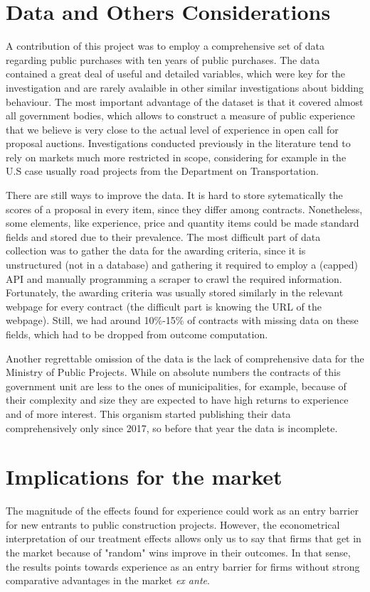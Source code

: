 \section{Data and Others Considerations}
A contribution of this project was to employ a comprehensive set of data regarding public purchases with ten years of public purchases. The data contained a great deal of useful and detailed variables, which were key for the investigation and are rarely avalaible in other similar investigations about bidding behaviour. The most important advantage of the dataset is that it covered almost all government bodies, which allows to construct a measure of public experience that we believe is very close to the actual level of experience in open call for proposal auctions. Investigations conducted previously in the literature tend to rely on markets much more restricted in scope, considering for example in the U.S case usually road projects from the Department on Transportation.

There are still ways to improve the data. It is hard to store sytematically the scores of a proposal in every item, since they differ among contracts. Nonetheless, some elements, like experience, price and quantity items could be made standard fields and stored due to their prevalence. The most difficult part of data collection was to gather the data for the awarding criteria, since it is unstructured (not in a database) and gathering it required to employ a (capped) API and manually programming a scraper to crawl the required information. Fortunately, the awarding criteria was usually stored similarly in the relevant webpage for every contract (the difficult part is knowing the URL of the webpage). Still, we had around 10\%-15\% of contracts with missing data on these fields, which had to be dropped from outcome computation.

Another regrettable omission of the data is the lack of comprehensive data for the Ministry of Public Projects. While on absolute numbers the contracts of this government unit are less to the ones of municipalities, for example, because of their complexity and size they are expected to have high returns to experience and of more interest. This organism started publishing their data comprehensively only since 2017, so before that year the data is incomplete.

\section{Implications for the market}
The magnitude of the effects found for experience could work as an entry barrier for new entrants to public construction projects. However, the econometrical interpretation of our treatment effects allows only us to say that firms that get in the market because of "random" wins improve in their outcomes. In that sense, the results points towards experience as an entry barrier for firms without strong comparative advantages in the market \textit{ex ante}.


